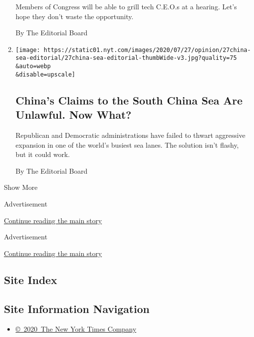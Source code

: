 \begin{enumerate}
  Members of Congress will be able to grill tech C.E.O.s at a hearing.
  Let's hope they don't waste the opportunity.

  By The Editorial Board
\item
  \href{/2020/07/27/opinion/pompeo-south-china-sea.html}{}

  \texttt{[image: https://static01.nyt.com/images/2020/07/27/opinion/27china-sea-editorial/27china-sea-editorial-thumbWide-v3.jpg?quality=75\\\&auto=webp\\\&disable=upscale]}

  \hypertarget{chinas-claims-to-the-south-china-sea-are-unlawful-now-what}{%
  \subsection{China's Claims to the South China Sea Are Unlawful. Now
  What?}\label{chinas-claims-to-the-south-china-sea-are-unlawful-now-what}}

  Republican and Democratic administrations have failed to thwart
  aggressive expansion in one of the world's busiest sea lanes. The
  solution isn't flashy, but it could work.

  By The Editorial Board
\end{enumerate}

Show More

Advertisement

\protect\hyperlink{after-mid1}{Continue reading the main story}

Advertisement

\protect\hyperlink{after-mktg}{Continue reading the main story}

\hypertarget{site-index}{%
\subsection{Site Index}\label{site-index}}

\hypertarget{site-information-navigation}{%
\subsection{Site Information
Navigation}\label{site-information-navigation}}

\begin{itemize}
\tightlist
\item
  \href{https://help.nytimes.com/hc/en-us/articles/115014792127-Copyright-notice}{©~2020~The
  New York Times Company}
\end{itemize}

